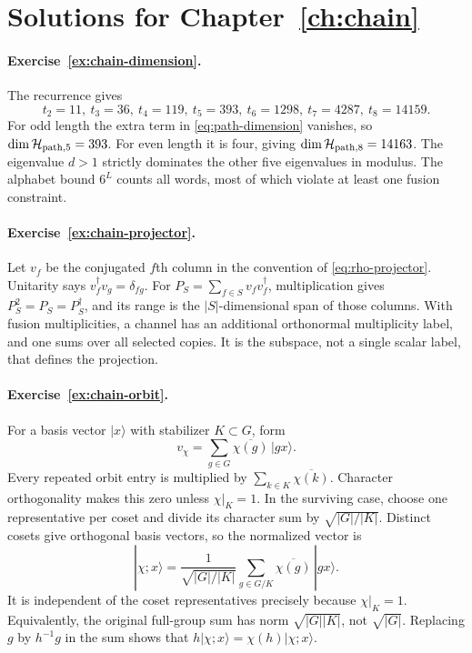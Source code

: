 \section{Solutions for Chapter~\ref{ch:chain}}

\paragraph{Exercise~\ref{ex:chain-dimension}.}
\label{sol:ex:chain-dimension}
The recurrence gives
\[
 t_2=11,\ t_3=36,\ t_4=119,\ t_5=393,\ t_6=1298,
 \ t_7=4287,\ t_8=14159.
\]
For odd length the extra term in \eqref{eq:path-dimension} vanishes,
so $\dim\mathcal H_{\mathrm{path},5}=393$. For even length it is four, giving
$\dim\mathcal H_{\mathrm{path},8}=14163$. The eigenvalue $d>1$ strictly dominates the
other five eigenvalues in modulus. The alphabet bound $6^L$ counts
all words, most of which violate at least one fusion constraint.



\paragraph{Exercise~\ref{ex:chain-projector}.}
\label{sol:ex:chain-projector}
Let $v_f$ be the conjugated $f$th column in the convention of
\eqref{eq:rho-projector}. Unitarity says $v_f^\dagger v_g=\delta_{fg}$.
For $P_S=\sum_{f\in S}v_fv_f^\dagger$, multiplication gives
$P_S^2=P_S=P_S^\dagger$, and its range is the $|S|$-dimensional
span of those columns. With fusion multiplicities, a channel has
an additional orthonormal multiplicity label, and one sums over
all selected copies. It is the subspace, not a single scalar label,
that defines the projection.



\paragraph{Exercise~\ref{ex:chain-orbit}.}
\label{sol:ex:chain-orbit}
For a basis vector $|x\rangle$ with stabilizer $K\subset G$, form
\[
 v_\chi=\sum_{g\in G}\overline{\chi(g)}\,|gx\rangle.
\]
Every repeated orbit entry is multiplied by
$\sum_{k\in K}\overline{\chi(k)}$. Character orthogonality makes
this zero unless $\chi|_K=1$. In the surviving case, choose one
representative per coset and divide its character sum by
$\sqrt{|G|/|K|}$. Distinct cosets give orthogonal basis vectors,
so the normalized vector is
\[
 |\chi;x\rangle=
 \frac1{\sqrt{|G|/|K|}}
 \sum_{g\in G/K}\overline{\chi(g)}\,|gx\rangle.
\]
It is independent of the coset representatives precisely because
$\chi|_K=1$. Equivalently, the original full-group sum has norm
$\sqrt{|G||K|}$, not $\sqrt{|G|}$. Replacing $g$ by $h^{-1}g$
in the sum shows that $h|\chi;x\rangle=\chi(h)|\chi;x\rangle$.



